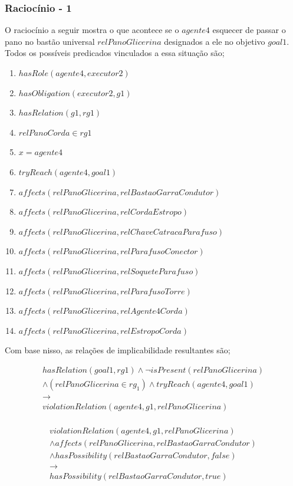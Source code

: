\documentclass[12pt]{article}
\begin{document}
\subsubsection{Raciocínio - 1} 


O raciocínio a seguir mostra o que acontece se o $agente4$ esquecer de passar o pano no bastão universal $relPanoGlicerina$ designados a ele no objetivo $goal1$. Todos os possíveis predicados vinculados a essa situação são;

\begin{enumerate}
	\item $hasRole(agente4,executor2)$ 
	\item $hasObligation(executor2,g1)$
	\item $hasRelation(g1,rg1)$ 
	\item $relPanoCorda \in rg1$
	\item $ x = agente4 $
	\item $tryReach(agente4,goal1)$
	\item $affects(relPanoGlicerina,relBastaoGarraCondutor)$
	\item $affects(relPanoGlicerina,relCordaEstropo)$  
	\item $affects(relPanoGlicerina,relChaveCatracaParafuso)$
	\item $affects(relPanoGlicerina,relParafusoConector)$ 
	\item $affects(relPanoGlicerina,relSoqueteParafuso)$ 
	\item $affects(relPanoGlicerina,relParafusoTorre)$
	\item $affects(relPanoGlicerina,relAgente4Corda)$ 
	\item $affects(relPanoGlicerina,relEstropoCorda)$	
\end{enumerate}

Com base nisso, as relações de implicabilidade resultantes são;

\begin{eqnarray}\nonumber
	hasRelation(goal1,rg1)\wedge \neg isPresent(relPanoGlicerina)  \nonumber \\ 
	\wedge (relPanoGlicerina\in rg_1) \wedge tryReach(agente4,goal1) \nonumber \\ 
	\to \nonumber \\ 
	violationRelation(agente4,g1,relPanoGlicerina) \nonumber \\	
\end{eqnarray}

\begin{eqnarray}\nonumber
	violationRelation(agente4,g1,relPanoGlicerina)  \nonumber \\ 
	\wedge affects(relPanoGlicerina,relBastaoGarraCondutor)   \nonumber \\ 
	\wedge hasPossibility(relBastaoGarraCondutor,false) \nonumber \\  
	\to \nonumber \\  
	hasPossibility(relBastaoGarraCondutor,true) 
\end{eqnarray}
\end{document}
